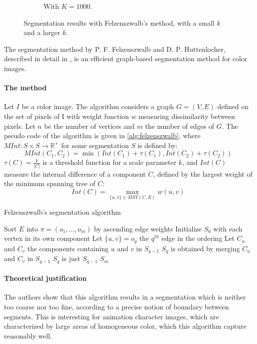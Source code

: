 \begin{figure}[htb!]
\begin{subfigure}{.3\textwidth}
\caption{With $K = 1000$.}
\label{fig:largeKSegmentation}
\end{subfigure}
\caption{Segmentation results with Felzenszwalb's method, with a small $k$ and a larger $k$.}
\end{figure}

The segmentation method by P. F. Felzenszwalb and D. P. Huttenlocher, described in detail in \cite{felzenszwalb2004efficient}, is an efficient graph-based segmentation method for color images.

\paragraph{The method} Let $I$ be a color image. The algorithm considers a graph $G = (V,E)$ defined on the set of pixels of I with weight function $w$ measuring dissimilarity between pixels. Let $n$ be the number of vertices and $m$ the number of edges of $G$. The pseudo code of the algorithm is given in \autoref{alg:felzenszwalb}, where $MInt : S \times S \rightarrow \mathbb{R}^+$ for some segmentation $S$ is defined by:
\[
MInt(C_1, C_2) = \min(Int(C_1) + \tau(C_1), Int(C_2) + \tau(C_2))
\]
$\tau(C) = \frac{k}{|C|}$ is a threshold function for a scale parameter $k$, and $Int(C)$ measure the internal difference of a component $C$, defined by
the largest weight of the minimum spanning tree of $C$:
\[
Int(C) = \max_{\{u,v\} \in MST(C, E)} w(u,v)
\]

\begin{algorithm}
\caption{Felzenszwalb's segmentation algorithm}
\label{alg:felzenszwalb}

\begin{algorithmic}[1]
\State Sort $E$ into $\pi = (o_1, ..., o_m)$ by ascending edge weights
\State Initialize $S_0$ with each vertex in its own component
\State Let $\{u,v\} = o_q$ the $q^{th}$ edge in the ordering
\State Let $C_u$ and $C_v$ the components containing $u$ and $v$ in $S_{q-1}$
\State $S_q$ is obtained by merging $C_u$ and $C_v$ in $S_{q-1}$
\Else
\State $S_q$ is just $S_{q-1}$
\EndIf
\EndFor
\Return $S_m$
\EndFunction
\end{algorithmic}
\end{algorithm}

\paragraph{Theoretical justification} The authors show that this algorithm results in a segmentation which is neither too coarse nor too fine, according to a precise notion of boundary between segments. This is interesting for animation character images, which are characterized by large areas of homogeneous color, which this algorithm capture reasonably well.

